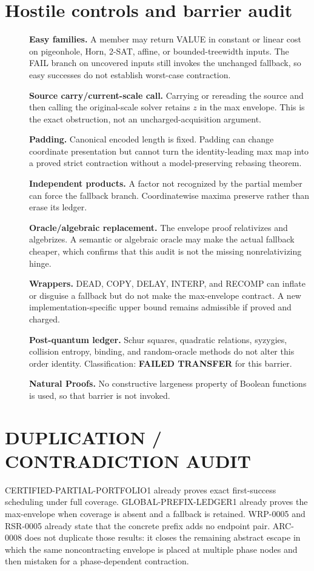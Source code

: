 \documentclass[11pt]{article}
\begin{document}
\section{Hostile controls and barrier audit}
\begin{description}
\item[] \textbf{Easy families.} A member may return VALUE in constant or
linear cost on pigeonhole, Horn, 2-SAT, affine, or bounded-treewidth inputs.
The FAIL branch on uncovered inputs still invokes the unchanged fallback, so
easy successes do not establish worst-case contraction.
\item[] \textbf{Source carry/current-scale call.} Carrying or rereading the
source and then calling the original-scale solver retains \(z\) in the max
envelope.  This is the exact obstruction, not an uncharged-acquisition
argument.
\item[] \textbf{Padding.} Canonical encoded length is fixed.  Padding can
change coordinate presentation but cannot turn the identity-leading max map
into a proved strict contraction without a model-preserving rebasing theorem.
\item[] \textbf{Independent products.} A factor not recognized by the
partial member can force the fallback branch.  Coordinatewise maxima preserve
rather than erase its ledger.
\item[] \textbf{Oracle/algebraic replacement.} The envelope proof relativizes
and algebrizes.  A semantic or algebraic oracle may make the actual fallback
cheaper, which confirms that this audit is not the missing nonrelativizing
hinge.
\item[] \textbf{Wrappers.} DEAD, COPY, DELAY, INTERP, and RECOMP can inflate
or disguise a fallback but do not make the max-envelope contract.  A new
implementation-specific upper bound remains admissible if proved and charged.
\item[] \textbf{Post-quantum ledger.} Schur squares, quadratic relations,
syzygies, collision entropy, binding, and random-oracle methods do not alter
this order identity.  Classification: \textbf{FAILED TRANSFER} for this
barrier.
\item[] \textbf{Natural Proofs.} No constructive largeness property of
Boolean functions is used, so that barrier is not invoked.
\end{description}

\section{DUPLICATION / CONTRADICTION AUDIT}
CERTIFIED-PARTIAL-PORTFOLIO1 already proves exact first-success scheduling
under full coverage.  GLOBAL-PREFIX-LEDGER1 already proves the max-envelope
when coverage is absent and a fallback is retained.  WRP-0005 and RSR-0005
already state that the concrete prefix adds no endpoint pair.  ARC-0008 does
not duplicate those results: it closes the remaining abstract escape in which
the same noncontracting envelope is placed at multiple phase nodes and then
mistaken for a phase-dependent contraction.
\end{document}
